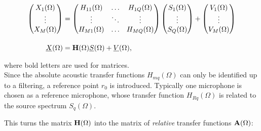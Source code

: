 \begin{equation}
\begin{split}
  \begin{pmatrix} X_1 (\Omega) \\ \vdots \\ X_M(\Omega)\end{pmatrix}
  &=
  \begin{pmatrix}
  	{H}_{11}(\Omega)  & \ldots & {H}_{1Q}(\Omega) \\
  	\vdots   & \ddots & \vdots   \\
  	{H}_{M1}(\Omega)  & \ldots & {H}_{MQ}(\Omega)
  \end{pmatrix}
  \begin{pmatrix} S_1 (\Omega) \\ \vdots \\ S_Q(\Omega)\end{pmatrix}
  + \begin{pmatrix} V_1 (\Omega) \\ \vdots \\ V_M(\Omega)\end{pmatrix} \\[1em]
  \underline{X}(\Omega)&= \mathbf{H}(\Omega) \underline{S}(\Omega)+ \underline{V}(\Omega),\\
  \label{eq:sig_model_mat}
\end{split}
\end{equation}


where bold letters are used for matrices. \\
Since the absolute acoustic transfer functions $H_{mq}(\Omega)$ can only be identified up to a filtering, a reference point $r_0$ is introduced. Typically one microphone is chosen as a reference microphone, whose transfer function $H_{Rq}(\Omega)$ is related to the source spectrum $S_q(\Omega)$.

This turns the matrix $\mathbf{H}(\Omega)$ into the matrix of \emph{relative} transfer functions $\mathbf{A}(\Omega)$:

